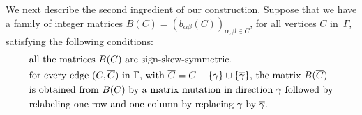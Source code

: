 \documentclass[letterpaper]{amsart}
\numberwithin{equation}{section}
\theoremstyle{definition}
\def\PP{\mathbb{P}}
\def\xx{\mathbf{x}}
\begin{document}
We next describe the second ingredient of our construction. 
Suppose that we have a family of integer matrices 
$B(C)=(b_{\alpha\beta}(C))_{\alpha, \beta\in C}$, for all vertices $C$ 
in~$\Gamma$, 
satisfying the following conditions: 
\begin{align} 
\label{eq:some-matrix-is-ss} 
&\text{all the matrices $B(C)$ are sign-skew-symmetric.} \hspace{0.7in} 
\\ 
\label{eq:B-mutation-gamma} 
&\text{for every edge $(C,\overline C )$ in $\Gamma$, 
with $\overline C =C-\{\gamma\}\cup\{\overline\gamma\}$, the matrix 
$B(\overline C)$ 
} 
\\ 
\nonumber 
&\text{is obtained from $B(C)$ by a matrix mutation in direction $\gamma$ 
followed by} 
\\ 
\nonumber 
&\text{relabeling one row and one column 
by replacing $\gamma$ by~$\overline \gamma$.} 
% 
\end{align} 
 
\end{document}

